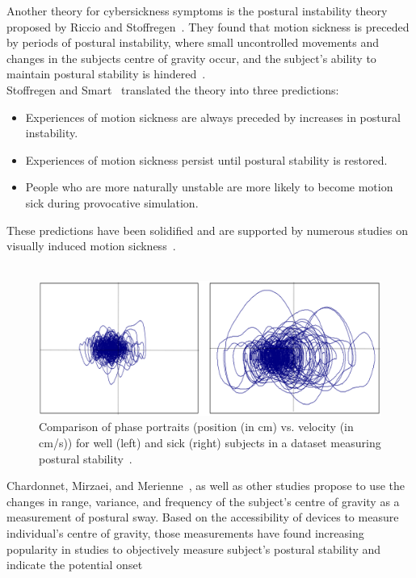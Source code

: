 Another theory for cybersickness symptoms is the postural instability theory proposed by Riccio and Stoffregen~\cite{Riccio1991}.
They found that motion sickness is preceded by periods of postural instability, where small uncontrolled movements and
changes in the subjects centre of gravity occur, and the subject's ability to maintain postural stability is
hindered~\cite{Riccio1991,Clifton2020}.
\\
Stoffregen and Smart~\cite{Stoffregen1998} translated the theory into three predictions:
\begin{itemize}
    \item Experiences of motion sickness are always preceded by increases in postural instability.
    \item Experiences of motion sickness persist until postural stability is restored.
    \item People who are more naturally unstable are more likely to become motion sick during provocative simulation.
\end{itemize}
These predictions have been solidified and are supported by numerous studies on visually induced motion
sickness~\cite{Clifton2020}.
\\
\\
\begin{figure}[h]
    \centering
    \includegraphics[width=\textwidth]{content/2_related_work/img/PosturalStability[Smart2013]}
    \caption{Comparison of phase portraits (position (in cm) vs. velocity (in cm/s)) for well (left) and sick (right)
        subjects in a dataset measuring postural stability~\cite{Smart2013}.}
    \label{fig:postural-instability-sample}
\end{figure}
Chardonnet, Mirzaei, and Merienne~\cite{Chardonnet2015}, as well as other studies propose to use the changes in 
range, variance, and frequency of the subject's centre of gravity as a measurement of postural sway.
Based on the accessibility of devices to measure individual's centre of gravity, those measurements have found
increasing popularity in studies to objectively measure subject's postural stability and indicate the potential onset
